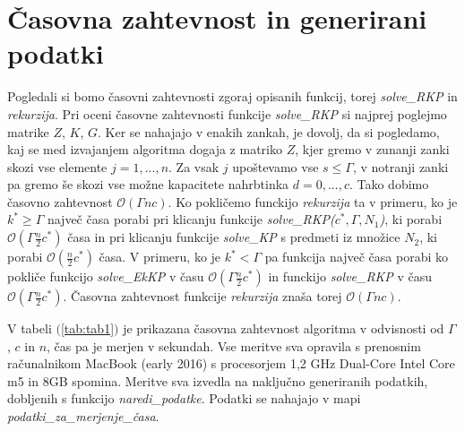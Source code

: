 \documentclass[a4paper,12pt]{article}
\theoremstyle{definition}
\begin{document}
\section{Časovna zahtevnost in generirani podatki}
\medskip
Pogledali si bomo časovni zahtevnosti zgoraj opisanih funkcij, torej \textit{solve\_RKP}
in \textit{rekurzija}. 
Pri oceni časovne zahtevnosti funkcije \textit{solve\_RKP} 
si najprej poglejmo matrike $Z$, $K$, $G$. Ker se nahajajo v enakih 
zankah, je dovolj, da si pogledamo, kaj se med izvajanjem algoritma
dogaja z matriko $Z$, kjer gremo v zunanji zanki skozi vse elemente $j = 1, ...,n$.
Za vsak $j$ upoštevamo vse $s \leq \Gamma$, v notranji zanki pa gremo še
skozi vse možne kapacitete nahrbtinka $d = 0, ..., c$. Tako dobimo časovno zahtevnost
$\mathcal{O}(\Gamma n c)$.
Ko pokličemo funckijo \textit{rekurzija} ta v primeru,
ko je $k^* \geq \Gamma$ največ 
časa porabi pri klicanju funkcije \textit{solve\_RKP($c^*, \Gamma, N_1$)},
ki porabi $\mathcal{O}(\Gamma \frac{n}{2} c^*)$ časa in pri klicanju funkcije \textit{solve\_KP} s predmeti iz množice 
$N_2$, ki porabi $\mathcal{O}(\frac{n}{2} c^*)$ časa. V primeru,
 ko je $k^* < \Gamma$ pa funkcija največ časa porabi ko pokliče funkcijo \textit{solve\_EkKP} v času $\mathcal{O}(\Gamma \frac{n}{2} c^*)$
 in funckijo \textit{solve\_RKP} v času $\mathcal{O}(\Gamma \frac{n}{2} c^*)$. Časovna zahtevnost funkcije \textit{rekurzija}
 znaša torej $\mathcal{O}(\Gamma n c)$.
 \par
 V tabeli $($\ref{tab:tab1}$)$ je prikazana časovna zahtevnost algoritma v odvisnosti od $\Gamma$, $c$ in $n$, čas pa je merjen v sekundah.
 Vse meritve sva opravila s prenosnim računalnikom MacBook (early 2016) s procesorjem 1,2 GHz Dual-Core Intel Core m5 in 8GB spomina.
  Meritve sva izvedla na naključno generiranih podatkih, dobljenih s funkcijo \textit{naredi\_podatke}.
 Podatki se nahajajo v mapi \textit{podatki\_za\_merjenje\_časa}.
 
     
 
\end{document}
